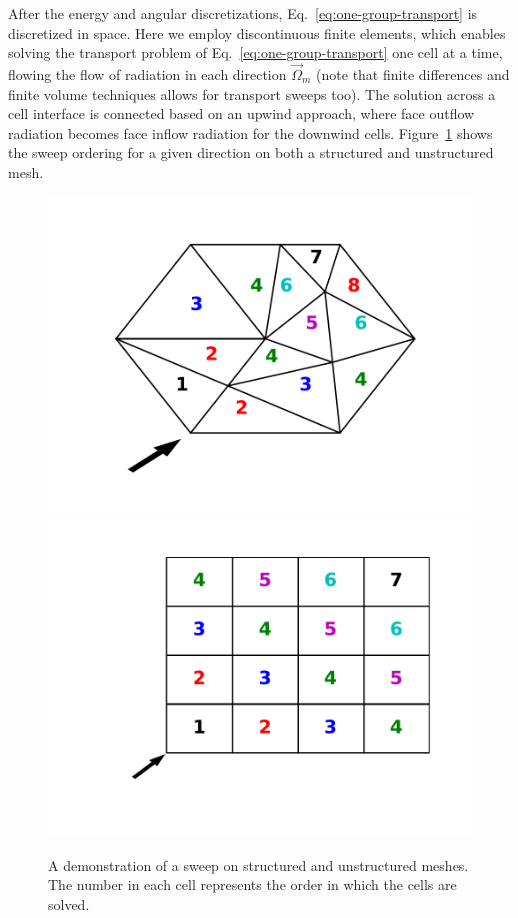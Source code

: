 \documentclass[times,final]{elsarticle}
\newcommand{\vo}{\vec{\Omega}}
\begin{document}
After the energy and angular discretizations, Eq.~\eqref{eq:one-group-transport} is discretized in space. Here we employ discontinuous finite elements, which enables solving the transport problem of Eq.~\eqref{eq:one-group-transport} one cell at a time, flowing the flow of radiation in each direction $\vo_m$ (note that finite differences and finite volume techniques allows for transport sweeps too).
The solution across a cell interface is connected based on an upwind approach, where face outflow radiation becomes face inflow radiation for the downwind cells. Figure~\ref{sweeps} shows the sweep ordering for a given direction on both a structured and unstructured mesh.
\begin{figure}[H]
\centering
\includegraphics[scale=0.4]{../figures/UnstructuredMesh.pdf}
\includegraphics[scale = 0.4]{../figures/StructuredMesh.pdf}
\caption{A demonstration of a sweep on structured and unstructured meshes. The number in each cell represents the order in which the cells are solved.}
\label{sweeps}
\end{figure}
\end{document}
